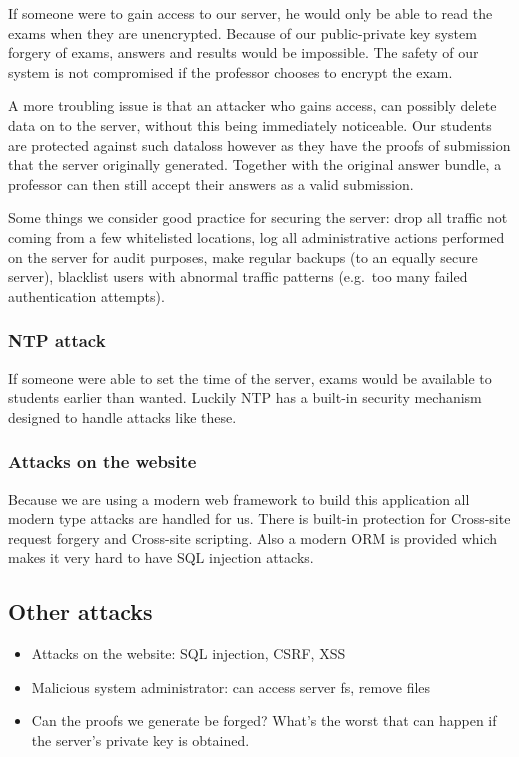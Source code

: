 \documentclass[12pt]{article}
\begin{document}
If someone were to gain access to our server, he would only be able to read the
exams when they are unencrypted. Because of our public-private key system
forgery of exams, answers and results would be impossible. The safety of our
system is not compromised if the professor chooses to encrypt the exam.

A more troubling issue is that an attacker who gains access, can possibly delete
data on to the server, without this being immediately noticeable. Our students
are protected against such dataloss however as they have the proofs of
submission that the server originally generated. Together with the original
answer bundle, a professor can then still accept their answers as a valid
submission.

Some things we consider good practice for securing the server: drop all traffic
not coming from a few whitelisted locations, log all administrative actions
performed on the server for audit purposes, make regular backups (to an equally
secure server), blacklist users with abnormal traffic patterns (e.g.\ too many
failed authentication attempts).

\subsubsection{NTP attack}

If someone were able to set the time of the server, exams would be available to
students earlier than wanted. Luckily NTP has a built-in security mechanism
designed to handle attacks like these.

\subsubsection{Attacks on the website}

Because we are using a modern web framework to build this application all modern
type attacks are handled for us. There is built-in protection for Cross-site
request forgery and Cross-site scripting. Also a modern ORM is provided which
makes it very hard to have SQL injection attacks.




\subsection{Other attacks}

\begin{itemize}
\item Attacks on the website: SQL injection, CSRF, XSS
\item Malicious system administrator: can access server fs, remove files
\item Can the proofs we generate be forged? What's the worst that can happen
if the server's private key is obtained.
\end{itemize}
\end{document}
